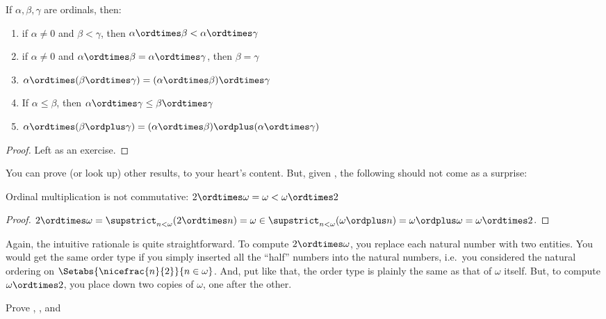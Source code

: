 \documentclass[../../../include/open-logic-section]{subfiles}
\begin{document}
\begin{lem}
	If $\alpha, \beta, \gamma$ are ordinals, then:
\begin{enumerate}
	\item{} if $\alpha \neq 0$ and $\beta < \gamma$, then $\alpha \ordtimes \beta < \alpha \ordtimes \gamma$
	\item{} if $\alpha \neq 0$ and $\alpha \ordtimes \beta = \alpha\ordtimes\gamma$, then $\beta = \gamma$
	\item{}  $\alpha \ordtimes (\beta \ordtimes \gamma) = (\alpha \ordtimes \beta) \ordtimes \gamma$
	\item{}  If $\alpha \leq \beta$, then $\alpha \ordtimes \gamma \leq \beta \ordtimes \gamma$
	\item{}  $\alpha \ordtimes (\beta \ordplus \gamma) = (\alpha \ordtimes \beta )\ordplus (\alpha\ordtimes \gamma)$
\end{enumerate}
\end{lem}
\begin{proof}
	Left as an exercise.
\end{proof}\noindent
You can prove (or look up) other results, to your heart's content. But, given , the following should not come as a surprise:
\begin{prop}
	Ordinal multiplication is not commutative: $2 \ordtimes \omega  = \omega < \omega \ordtimes 2$
\end{prop}
\begin{proof}
$		2 \ordtimes \omega = \supstrict_{n < \omega}(2\ordtimes  n) = \omega \in \supstrict_{n < \omega}(\omega \ordplus n) = \omega \ordplus \omega = \omega \ordtimes 2$.
\end{proof}\noindent
Again, the intuitive rationale is quite straightforward. To compute $2 \ordtimes \omega$, you replace each natural number with two entities. You would get the same order type if you simply inserted all the ``half'' numbers into the natural numbers, i.e.\ you considered the natural ordering on $\Setabs{\nicefrac{n}{2}}{n \in \omega}$. And, put like that, the order type is plainly the same as that of $\omega$ itself. But, to compute $\omega \ordtimes 2$, you place down two copies of $\omega$, one after the other. 
\begin{prob}
	Prove , , and 
\end{prob}
\end{document}
